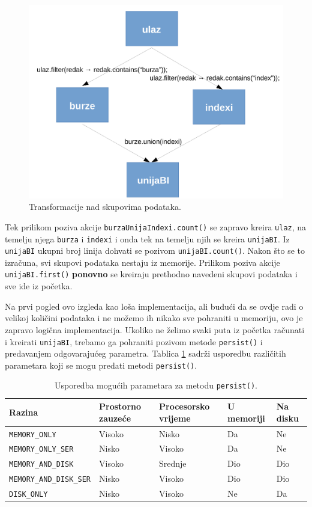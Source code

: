 \documentclass[times, utf8, zavrsni, numeric]{fer}
\begin{document}
\begin{figure}[htb]
\centering
\includegraphics[scale = 0.8]{img/transformacijeCropped.pdf}
\caption{Transformacije nad skupovima podataka.}
\label{fig:burzeUnijaIndexiRDD}
\end{figure}

Tek prilikom poziva akcije \texttt{burzaUnijaIndexi.count()} se zapravo kreira  \texttt{ulaz}, na temelju njega \texttt{burza} i \texttt{indexi} i onda tek na temelju njih se kreira \texttt{unijaBI}. Iz  \texttt{unijaBI} ukupni broj linija dohvati se pozivom \texttt{unijaBI.count()}. 
Nakon što se to izračuna, svi skupovi podataka nestaju iz memorije.  Prilikom poziva akcije \texttt{unijaBI.first()} \textbf{ponovno} se kreiraju prethodno navedeni skupovi podataka i sve ide iz početka.

Na prvi pogled ovo izgleda kao loša implementacija, ali budući da se ovdje radi o velikoj količini podataka i ne možemo ih nikako sve pohraniti u memoriju, ovo je zapravo logična implementacija. 
Ukoliko ne želimo svaki puta iz početka računati i kreirati \texttt{unijaBI}, trebamo ga pohraniti pozivom metode \texttt{persist()} i predavanjem odgovarajućeg parametra. Tablica \ref{tbl:razinePerzistencije} sadrži usporedbu različitih parametara koji se mogu predati metodi \texttt{persist()}.

\begin{table}[htb]
\scriptsize
\caption{Usporedba mogućih parametara za metodu \texttt{persist()}.}
\label{tbl:razinePerzistencije}
\centering
\begin{tabular}{lllll} 
\hline
Razina & Prostorno zauzeće & Procesorsko vrijeme & U memoriji & Na disku\\
\hline
\texttt{MEMORY\_ONLY} & Visoko & Nisko & Da & Ne  \\
\texttt{MEMORY\_ONLY\_SER} & Nisko & Visoko & Da & Ne  \\
\texttt{MEMORY\_AND\_DISK} & Visoko & Srednje & Dio & Dio \\
\texttt{MEMORY\_AND\_DISK\_SER} & Nisko & Visoko & Dio & Dio \\
\texttt{DISK\_ONLY} & Nisko & Visoko & Ne & Da \\
\hline
\end{tabular}
\end{table}
\end{document}
